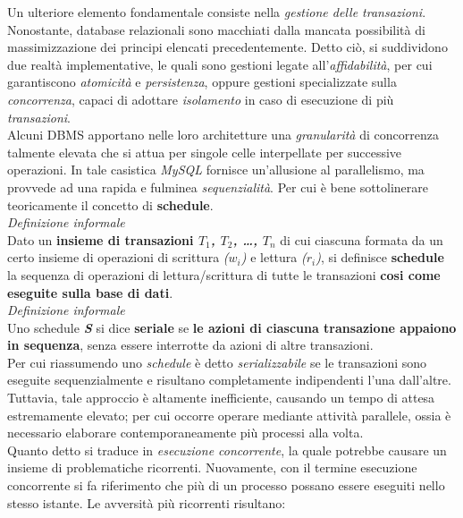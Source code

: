 \documentclass{article}
\begin{document}
Un ulteriore elemento fondamentale consiste nella \textit{gestione delle transazioni}. Nonostante, database relazionali sono macchiati dalla mancata possibilità di massimizzazione dei principi elencati precedentemente. Detto ciò, si suddividono due realtà implementative, le quali sono gestioni legate all'\textit{affidabilità}, per cui garantiscono \textit{atomicità} e \textit{persistenza}, oppure gestioni specializzate sulla \textit{concorrenza}, capaci di adottare \textit{isolamento} in caso di esecuzione di più \textit{transazioni}.\vspace{14pt}\\
Alcuni DBMS apportano nelle loro architetture una \textit{granularità} di concorrenza talmente elevata che si attua per singole celle interpellate per successive operazioni. In tale casistica \textit{MySQL} fornisce un'allusione al parallelismo, ma provvede ad una rapida e fulminea \textit{sequenzialità}. Per cui è bene sottolinerare teoricamente il concetto di \textbf{schedule}.\vspace*{14pt}\\
\textit{Definizione informale}\\
Dato un \textbf{insieme di transazioni \textit{$T_1$, $T_2$, \dots, $T_n$}} di cui ciascuna formata da un certo insieme di operazioni di scrittura \textit{($w_i$)} e lettura \textit{($r_i$)}, si definisce \textbf{schedule} la sequenza di operazioni di lettura/scrittura di tutte le transazioni \textbf{cosi come eseguite sulla base di dati}.\vspace*{14pt}\\
\textit{Definizione informale}\\
Uno schedule \textbf{\textit{S}} si dice \textbf{seriale} se \textbf{le azioni di ciascuna transazione appaiono in sequenza}, senza essere interrotte da azioni di altre transazioni.\vspace*{14pt}\\
Per cui riassumendo uno \textit{schedule} è detto \textit{serializzabile} se le transazioni sono eseguite sequenzialmente e risultano completamente indipendenti l'una dall'altre. Tuttavia, tale approccio è altamente inefficiente, causando un tempo di attesa estremamente elevato; per cui occorre operare mediante attività parallele, ossia è necessario elaborare contemporaneamente più processi alla volta.\vspace*{14pt}\\
Quanto detto si traduce in \textit{esecuzione concorrente}, la quale potrebbe causare un insieme di problematiche ricorrenti. Nuovamente, con il termine esecuzione concorrente si fa riferimento che più di un processo possano essere eseguiti nello stesso istante. Le avversità più ricorrenti risultano:
\end{document}
